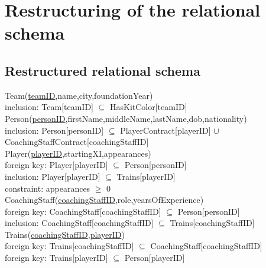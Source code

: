 
\section{Restructuring of the relational schema}

\subsection{Restructured relational schema}

\vspace{12px}
{\color{ForestGreen}Team(\underline{teamID},name,city,foundationYear)}\\
{\color{Orange}\hspace{2mm} inclusion: {\color{Magenta}Team[teamID] $\subseteq$ HasKitColor[teamID]}} \\

{\color{ForestGreen}Person(\underline{personID},firstName,middleName,lastName,dob,nationality)}\\
{\color{Orange}\hspace{2mm} inclusion: {\color{Magenta} Person[personID] $\subseteq $ PlayerContract[playerID] $\cup$ CoachingStaffContract[coachingStaffID]}} \\ 

{\color{ForestGreen}Player(\underline{playerID},startingXI,appearances)}\\
{\color{Orange}\hspace{2mm} foreign key: {\color{Magenta}Player[playerID] $\subseteq$ Person[personID]}} \\
{\color{Orange}\hspace{2mm} inclusion: {\color{Magenta}Player[playerID] $\subseteq$ Trains[playerID]}} \\
{\color{Orange}\hspace{2mm} constraint: {\color{Magenta}appearances $\geqslant$  0 }} \\

{\color{ForestGreen}CoachingStaff(\underline{coachingStaffID},role,yearsOfExperience)}\\
{\color{Orange}\hspace{2mm} foreign key: {\color{Magenta}CoachingStaff[coachingStaffID] $\subseteq$ Person[personID]}} \\
{\color{Orange}\hspace{2mm} inclusion: {\color{Magenta}CoachingStaff[coachingStaffID] $\subseteq$ Trains[coachingStaffID]}} \\

{\color{ForestGreen}Trains(\underline{coachingStaffID},\underline{playerID})}\\
{\color{Orange}\hspace{2mm} foreign key: {\color{Magenta}Trains[coachingStaffID] $\subseteq$ CoachingStaff[coachingStaffID]}} \\
{\color{Orange}\hspace{2mm} foreign key: {\color{Magenta}Trains[playerID] $\subseteq$ Person[playerID]}} \\


